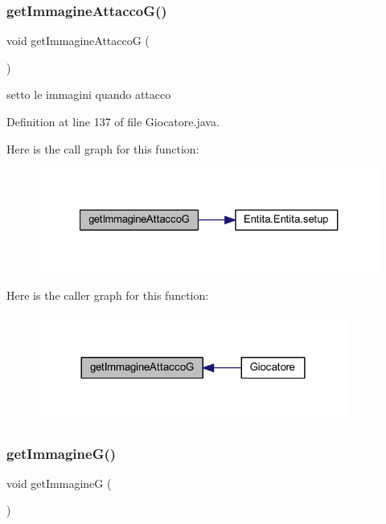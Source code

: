 \subsubsection{\texorpdfstring{get\+Immagine\+Attacco\+G()}{getImmagineAttaccoG()}}
{\footnotesize\ttfamily void get\+Immagine\+AttaccoG (\begin{DoxyParamCaption}{ }\end{DoxyParamCaption})}



setto le immagini quando attacco 



Definition at line 137 of file Giocatore.\+java.

Here is the call graph for this function\+:
\nopagebreak
\begin{figure}[H]
\begin{center}
\leavevmode
\includegraphics[width=327pt]{class_entita_1_1_giocatore_acc1691c076ed9335796eac421dce845f_cgraph}
\end{center}
\end{figure}
Here is the caller graph for this function\+:
\nopagebreak
\begin{figure}[H]
\begin{center}
\leavevmode
\includegraphics[width=288pt]{class_entita_1_1_giocatore_acc1691c076ed9335796eac421dce845f_icgraph}
\end{center}
\end{figure}
\mbox{\label{class_entita_1_1_giocatore_abac365540bed82b4025e8e845b779c72}} 
\subsubsection{\texorpdfstring{get\+Immagine\+G()}{getImmagineG()}}
{\footnotesize\ttfamily void get\+ImmagineG (\begin{DoxyParamCaption}{ }\end{DoxyParamCaption})}




